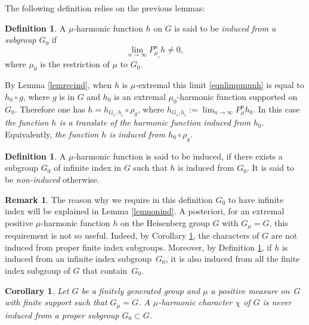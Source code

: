 \documentclass[JEP,XML,SOM,Unicode]{cedram}
\newtheorem{Cor}[Thm]{Corollary}
\theoremstyle{definition}
\newtheorem{Def}[Thm]{Definition}
\newtheorem{Rem}[Thm]{Remark}
\let\ra\to
\begin{document}
The following definition relies on the previous lemmas:

\begin{Def}

\label{defnonind}
A $\mu$-harmonic function $h$ on $G$
is said to be \emph{induced from a subgroup $G_0$}
if
\begin{equation}
\label{eqnlimpmunh}
\lim_{n\ra\infty}P_{\mu_{_0}}^nh\neq 0,
\end{equation}
where $\mu_0$ is the restriction of $\mu$ to $G_0$.

By Lemma \ref{lemrecind}, when $h$ is $\mu$-extremal this limit
\eqref{eqnlimpmunh} is equal to $h_0\circ g$, where
$g$ is in $G$ and
$h_0$ is an extremal $\mu_0$-harmonic function supported on $G_0$.
Therefore one has $h=h_{G_{_0},h_{_0}}\circ \rho_g$,
where $h_{G_{_0},h_{_0}}:=
\lim_{n\ra\infty}P_{\mu}^nh_0$.
In this case \emph{the function $h$ is a translate of
the harmonic function induced from $h_0$}.
Equivalently, \emph{the function $h$ is induced from $h_0\circ \rho_g$}.
\end{Def}

\begin{Def}

\label{defnonindsuite}
A $\mu$-harmonic function is said to be {induced},
if there exists a subgroup $G_0$ of infinite index in $G$
such that $h$ is induced from $G_0$.
It is said to be \emph{non-induced} otherwise.
\end{Def}

\begin{Rem}

The reason why we require in this definition $G_0$ to have infinite index
will be explained in Lemma \ref{lemnonind}.
A posteriori, for an extremal positive $\mu$-harmonic function
$h$ on the Heisenberg group $G$ with $G_\mu=G$,
this requirement is not so useful.
Indeed, by Corollary \ref{corconind}, the characters of $G$ are not induced
from proper finite index subgroups.
Moreover, by Definition \ref{defnonind}, if $h$ is induced from an infinite index subgroup~$G_0$, it is also induced from all the finite index subgroup of $G$ that contain~$G_0$.
\end{Rem}

\begin{Cor}
\label{corconind}
Let $G$ be a finitely generated group and
$\mu$ a positive measure on~$G$ with finite support such that $G_\mu=G$.
A $\mu$-harmonic character $\chi$ of $G$
is never induced from a proper subgroup $G_0\subset G$.
\end{Cor}
\end{document}
